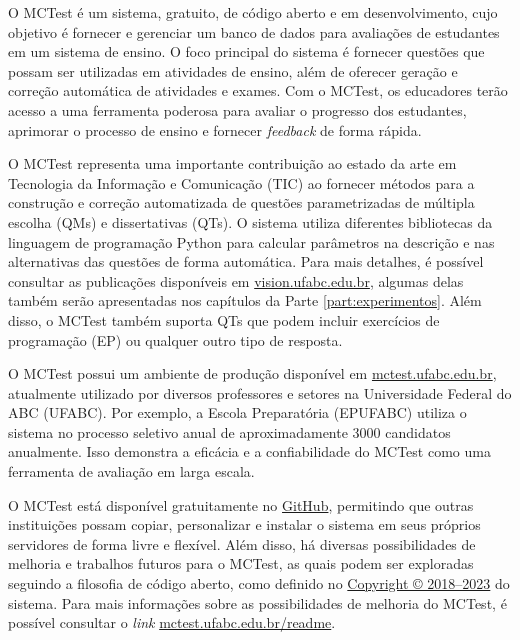 
\label{ch:visaoGeral}

O MCTest é um sistema, gratuito, de código aberto e em desenvolvimento, cujo objetivo é fornecer e gerenciar um banco de dados para avaliações de estudantes em um sistema de ensino. O foco principal do sistema é fornecer questões que possam ser utilizadas em atividades de ensino, além de oferecer geração e correção automática de atividades e exames. Com o MCTest, os educadores terão acesso a uma ferramenta poderosa para avaliar o progresso dos estudantes, aprimorar o processo de ensino e fornecer \textit{feedback} de forma rápida.

O MCTest representa uma importante contribuição ao estado da arte em Tecnologia da Informação e Comunicação (TIC) ao fornecer métodos para a construção e correção automatizada de questões parametrizadas de múltipla escolha (QMs) e dissertativas (QTs). O sistema utiliza diferentes bibliotecas da linguagem de programação Python para calcular parâmetros na descrição e nas alternativas das questões de forma automática. Para mais detalhes, é possível consultar as publicações disponíveis em \href{http://vision.ufabc.edu.br}{vision.ufabc.edu.br}, algumas delas também serão apresentadas nos capítulos da Parte \ref{part:experimentos}. Além disso, o MCTest também suporta QTs que podem incluir exercícios de programação (EP) ou qualquer outro tipo de resposta.

O MCTest possui um ambiente de produção disponível em \href{http://mctest.ufabc.edu.br}{mctest.ufabc.edu.br}, atualmente utilizado por diversos professores e setores na Universidade Federal do ABC (UFABC). Por exemplo, a Escola Preparatória (EPUFABC) utiliza o sistema no processo seletivo anual de aproximadamente 3000 candidatos anualmente. Isso demonstra a eficácia e a confiabilidade do MCTest como uma ferramenta de avaliação em larga escala.

O MCTest está disponível gratuitamente no \href{http://github.com/fzampirolli/mctest}{GitHub}, permitindo que outras instituições possam copiar, personalizar e instalar o sistema em seus próprios servidores de forma livre e flexível. Além disso, há diversas possibilidades de melhoria e trabalhos futuros para o MCTest, as quais podem ser exploradas seguindo a filosofia de código aberto, como definido no \href{http://mctest.ufabc.edu.br/license}{Copyright © 2018–2023} do sistema. Para mais informações sobre as possibilidades de melhoria do MCTest, é possível consultar o \textit{link} \href{http://mctest.ufabc.edu.br/readme}{mctest.ufabc.edu.br/readme}.

